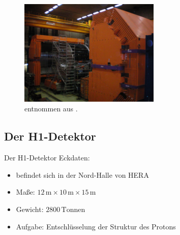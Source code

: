 \documentclass[aspectratio=1610, 9pt]{beamer}
\begin{document}
\begin{frame}
  \begin{figure}
    \centering
    \includegraphics[width=0.6\textwidth]{images/Zeus-Real.jpeg}
    \caption{entnommen aus \cite{Wiki-Zeus}.}
  \end{figure}
\end{frame}

\subsection{Der H1-Detektor}

\begin{frame}{Der H1-Detektor}
  Eckdaten:
  \begin{itemize}
    \item{befindet sich in der Nord-Halle von HERA}
    \item{Maße: $12 \,\mathrm{m} \times 10 \,\mathrm{m} \times 15 \,\mathrm{m}  $  }
    \item{Gewicht: $2800 \,\mathrm{Tonnen}$ }
    \item{Aufgabe: Entschlüsselung der Struktur des Protons}
  \end{itemize}
\end{frame}
\end{document}
